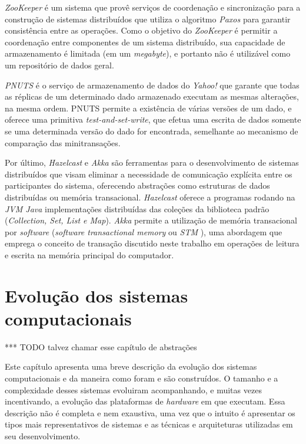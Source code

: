 \documentclass[11pt,twoside,a4paper]{book}
\begin{document}
\emph{ZooKeeper} é um sistema que provê serviços de coordenação e sincronização para a construção de sistemas distribuídos que utiliza o algoritmo \emph{Paxos} \cite{paxos} para garantir consistência entre as operações. Como o objetivo do \emph{ZooKeeper} é permitir a coordenação entre componentes de um sistema distribuído, sua capacidade de armazenamento é limitada (em um \emph{megabyte}), e portanto não é utilizável como um repositório de dados geral.

\emph{PNUTS} é o serviço de armazenamento de dados do \emph{Yahoo!} que garante que todas as réplicas de um determinado dado armazenado executam as mesmas alterações, na mesma ordem. PNUTS permite a existência de várias versões de um dado, e oferece uma primitiva \emph{test-and-set-write}, que efetua uma escrita de dados somente se uma determinada versão do dado for encontrada, semelhante ao mecanismo de comparação das minitransações.

Por último, \emph{Hazelcast} \cite{hazelcast} e \emph{Akka} \cite{akka} são ferramentas para o desenvolvimento de sistemas distribuídos que visam eliminar a necessidade de comunicação explícita entre os participantes do sistema, oferecendo abstrações como estruturas de dados
distribuídas ou memória transacional. \emph{Hazelcast} oferece a programas rodando na \emph{JVM Java} implementações distribuídas das coleções da biblioteca padrão (\emph{Collection, Set, List e Map}). \emph{Akka} permite a utilização de memória transacional por \emph{software} (\emph{software transactional memory} ou \emph{STM} \cite{stm}), uma abordagem que emprega o conceito de transação discutido neste trabalho em operações de leitura e escrita na memória principal do computador.

\chapter{Evolução dos sistemas computacionais}
\label{chap:evolucao}
*** TODO talvez chamar esse capítulo de abstrações

Este capítulo apresenta uma breve descrição da evolução dos sistemas computacionais e da maneira como foram e são construídos. O tamanho e a complexidade desses sistemas evoluiram acompanhando, e muitas vezes incentivando, a evolução das plataformas de \emph{hardware} em que executam. Essa descrição não é completa e nem exaustiva, uma vez que o intuito é apresentar os tipos mais representativos de sistemas e as técnicas e arquiteturas utilizadas em seu desenvolvimento.
\end{document}
